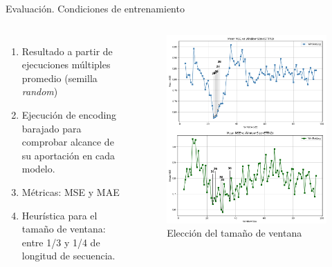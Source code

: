 \documentclass[compress]{beamer}
\begin{document}
	\begin{frame}{Evaluación. Condiciones de entrenamiento}
		\begin{columns}
			\begin{enumerate}
				\item Resultado a partir de ejecuciones múltiples promedio (semilla \textit{random})
				\item Ejecución de encoding barajado para comprobar alcance de su aportación en cada modelo.
				\item Métricas: MSE y MAE
				\item Heurística para el tamaño de ventana: entre 1/3 y 1/4 de longitud de secuencia.
			\end{enumerate}
			
			\centering
			\begin{figure}
				\includegraphics[height=\columnwidth]{pic/wind.png}
				\caption{Elección del tamaño de ventana}
			\end{figure}
			
		\end{columns} 
		
		
	\end{frame}
	
\end{document}
